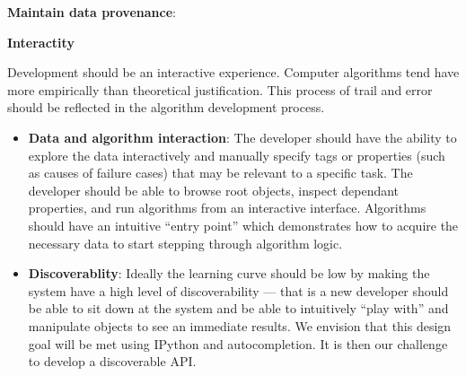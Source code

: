 

    \item \textbf{Maintain data provenance}:

    \item \textbf{Interactity}

        Development should be an interactive experience.
        Computer algorithms tend have more empirically than
          theoretical justification.
        This process of trail and error should be reflected in the
          algorithm development process.

        \begin{itemize}

            \item \textbf{Data and algorithm interaction}:
                The developer should have the ability to explore
                  the data interactively and manually specify tags or
                  properties (such as causes of failure cases) that
                  may be relevant to a specific task.
                The developer should be able to browse root
                  objects, inspect dependant properties, and run
                  algorithms from an interactive interface.
                Algorithms should have an intuitive ``entry point''
                  which demonstrates how to acquire the necessary
                  data to start stepping through algorithm logic.

            \item \textbf{Discoverablity}:
                Ideally the learning curve should be low by making
                  the system have a high level of discoverability ---
                  that is a new developer should be able to sit down
                  at the system and be able to intuitively ``play
                  with'' and manipulate objects to see an immediate %
                results.
                We envision that this design goal will be met using
                  IPython and autocompletion.
                It is then our challenge to develop a discoverable
                  API{}.
        \end{itemize}


